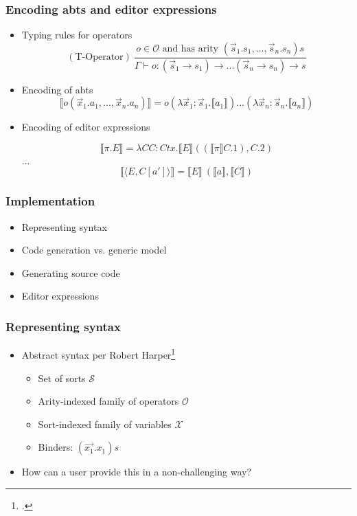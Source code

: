 \documentclass[t,24pt,aspectratio=169]{beamer}
\newcommand{\enc}[1]{\llbracket #1 \rrbracket}
\newcommand{\conf}[2]{\langle #1,#2 \rangle}
\renewcommand{\vec}[1]{\overrightarrow{#1}}
\begin{document}
\begin{frame}[hvid]
    \frametitle{Encoding abts and editor expressions}
    \begin{itemize}
        \item Typing rules for operators
              \[
                  (\text{T-Operator}) \ \frac{o \in \mathcal{O} \text{ and has arity } (\Vec{s}_1.s_1,...,\Vec{s}_n.s_n)s}{\Gamma \vdash o : (\Vec{s}_1 \rightarrow s_1) \rightarrow ... (\Vec{s}_n \rightarrow s_n) \rightarrow s}
              \]
        \item Encoding of abts
              \[
                  \llbracket o(\Vec{x}_1.a_1,...,\Vec{x}_n.a_n) \rrbracket = o(\lambda \Vec{x}_1:\Vec{s}_1.\llbracket a_1 \rrbracket)...(\lambda \Vec{x}_n : \Vec{s}_n.\llbracket a_n \rrbracket)
              \]
        \item Encoding of editor expressions
              \begin{center}
                  \[
                      \llbracket \pi.E \rrbracket = \lambda CC : Ctx.\llbracket E \rrbracket ((\llbracket \pi \rrbracket C.1), C.2)
                  \]
                  ...
                  \[
                      \enc{\conf{E}{C[a']}} = \enc{E} \ (\enc{a}, \enc{C})
                  \]
              \end{center}
    \end{itemize}
\end{frame}




\begin{frame}[hvid]
    \frametitle{Implementation}
    \begin{itemize}
        \item Representing syntax
        \item Code generation vs. generic model
        \item Generating source code
        \item Editor expressions
    \end{itemize}
\end{frame}

\begin{frame}[hvid]
    \frametitle{Representing syntax}
    \begin{itemize}
        \item Abstract syntax per Robert Harper\footcite{harper}
              \begin{itemize}
                  \item Set of sorts $\mathcal{S}$
                  \item Arity-indexed family of operators $\mathcal{O}$
                  \item Sort-indexed family of variables $\mathcal{X}$
                  \item Binders: $(\vec{x_1}.x_1)s$
              \end{itemize}
              \pause
        \item How can a user provide this in a non-challenging way?
    \end{itemize}
\end{frame}
\end{document}
